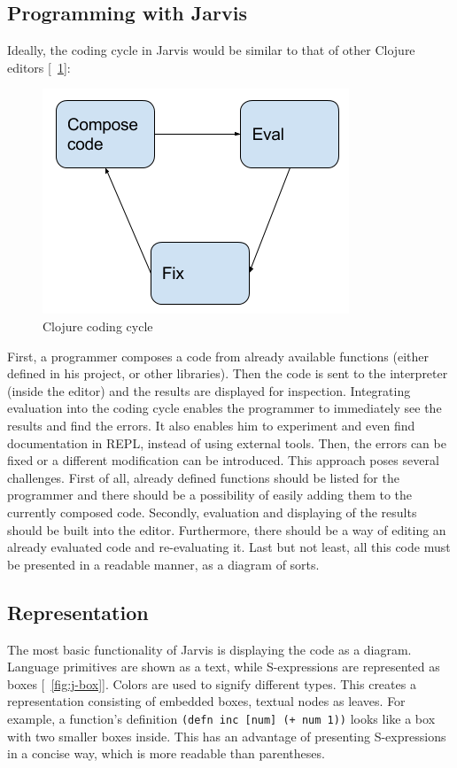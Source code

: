 \documentclass[11pt]{scrartcl}
\newcommand*{\figref}[1]{[\textbf{\figurename}~\ref{#1}]}
\begin{document}
\subsection{Programming with Jarvis}
Ideally, the coding cycle in Jarvis would be similar to that of other Clojure
editors \figref{fig:clojure-coding}:

\begin{figure}[hbt]
  \centering
  \includegraphics[scale=0.5]{img/Programming.png}
  \caption{Clojure coding cycle}
\label{fig:clojure-coding}
\end{figure}

First, a programmer composes a code from already available functions (either
defined in his project, or other libraries).
Then the code is sent to the interpreter (inside the editor) and the results are
displayed for inspection.
Integrating evaluation into the coding cycle enables the programmer to
immediately see the results and find the errors.
It also enables him to experiment and even find documentation in REPL, instead
of using external tools.
Then, the errors can be fixed or a different modification can be introduced.
This approach poses several challenges.
First of all, already defined functions should be listed for the programmer and
there should be a possibility of easily adding them to the currently composed
code.
Secondly, evaluation and displaying of the results should be built into the
editor.
Furthermore, there should be a way of editing an already evaluated code and
re-evaluating it.
Last but not least, all this code must be presented in a readable manner, as a
diagram of sorts.

\subsection{Representation}
The most basic functionality of Jarvis is displaying the code as a diagram.
Language primitives are shown as a text, while S-expressions are
represented as boxes \figref{fig:j-box}.
Colors are used to signify different types.
This creates a representation consisting of embedded boxes, textual nodes as
leaves.
For example, a function’s definition \lstinline|(defn inc [num] (+ num 1))| looks like a box
with two smaller boxes inside.
This has an advantage of presenting S-expressions in a concise way, which is
more readable than parentheses.
\end{document}
